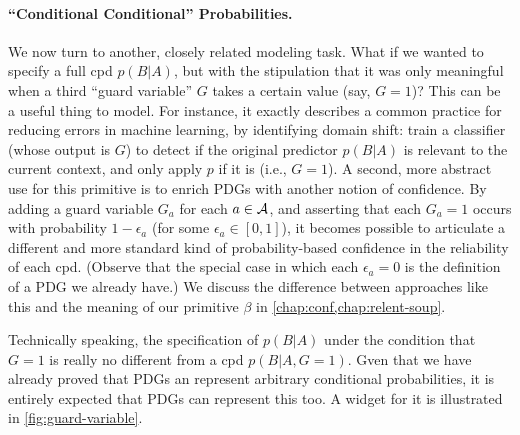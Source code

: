 \paragraph{``Conditional Conditional'' Probabilities.}
We now turn to another, closely related modeling task. 
What if we wanted to specify a full cpd $p(B|A)$, but with the stipulation that it was only meaningful when a third ``guard variable'' $G$ takes a certain value (say, $G{=}1$)?
This can be a useful thing to model. For instance, it exactly describes
    a common practice for reducing errors in machine learning, by identifying domain shift: train a classifier (whose output is $G$) to detect if the original predictor $p(B|A)$ is relevant to the current context, and only apply $p$ if it is (i.e., $G{=}1$).
A second, more abstract use for this primitive is to enrich PDGs with another notion of confidence. 
By adding a guard variable $G_a$ for each $a \in \mathcal A$, and asserting that each $G_a = 1$ occurs with probability $1 - \epsilon_a$ (for some $\epsilon_a \in [0,1]$), it becomes possible to articulate a different and more standard kind of probability-based confidence in the reliability of each cpd.
(Observe that the special case in which each $\epsilon_a= 0$ is the definition of a PDG we already have.)
\iffoundations
We discuss the difference between approaches like this and the meaning of our primitive $\beta$ in \cref{chap:conf,chap:relent-soup}. 
\fi

Technically speaking, the specification of $p(B|A)$ under the condition that $G = 1$ is really no different from a cpd $p(B|A, G{=}1)$.
Gven that we have already proved that PDGs an represent arbitrary conditional probabilities, it is entirely expected that PDGs can represent this too. 
A widget for it is illustrated in \cref{fig:guard-variable}.

